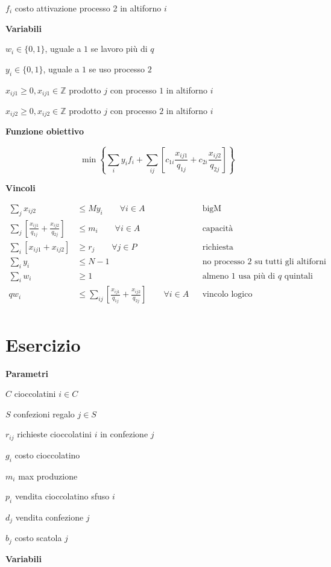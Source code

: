 \documentclass[10pt,a4paper,twoside,openright]{book}
\newcounter{es}
\newcommand{\Es}{
	\stepcounter{es}
	\section{Esercizio \arabic{es}}
	}
\numberwithin{es}{chapter}
\newcommand{\Par}{\textbf{Parametri}}
\newcommand{\Var}{\textbf{Variabili}}
\newcommand{\Fob}{\textbf{Funzione obiettivo}}
\newcommand{\Vin}{\textbf{Vincoli}}
\begin{document}
$f_{i}$ costo attivazione processo 2 in altiforno $i$

\Var

$w_{i} \in \{0,1\}$, uguale a $1$ se lavoro più di $q$

$y_{i} \in \{0,1\}$, uguale a $1$ se uso processo $2$

$x_{ij1} \geq 0,x_{ij1} \in \mathbb{Z}$ prodotto $j$ con processo $1$ in altiforno $i$

$x_{ij2} \geq 0,x_{ij2} \in \mathbb{Z}$ prodotto $j$ con processo $2$ in altiforno $i$

\Fob

\begin{equation*}
	\min \left\{\sum _{i} y_{i} f_{i} +\sum _{ij}\left[ c_{1i}\frac{x_{ij1}}{q_{1j}} +c_{2i}\frac{x_{ij2}}{q_{2j}}\right]\right\}
\end{equation*}

\Vin

\begin{align*}
	\sum _{j} x_{ij2} & \leq My_{i} \qquad\forall i\in A && \text{bigM} \\
	\sum _{j}\left[\frac{x_{ij1}}{q_{1j}} +\frac{x_{ij2}}{q_{2j}}\right] & \leq m_{i} \qquad\forall i\in A && \text{capacità} \\
	\sum _{i}[ x_{ij1} +x_{ij2}] & \geq r_{j} \qquad\forall j\in P && \text{richiesta} \\
	\sum _{i} y_{i} & \leq N-1 && \text{no processo $2$ su tutti gli altiforni} \\
	\sum _{i} w_{i} & \geq 1 && \text{almeno 1 usa più di $q$ quintali} \\
	qw_{i} & \leq \sum _{ij}\left[\frac{x_{ij1}}{q_{1j}} +\frac{x_{ij2}}{q_{2j}}\right] \qquad\forall i\in A && \text{vincolo logico} \\
\end{align*}

\Es

\Par

$C$ cioccolatini $i\in C$

$S$ confezioni regalo $j\in S$

$r_{ij}$ richieste cioccolatini $i$ in confezione $j$

$g_{i}$ costo cioccolatino

$m_{i}$ max produzione

$p_{i}$ vendita cioccolatino sfuso $i$

$d_{j}$ vendita confezione $j$

$b_{j}$ costo scatola $j$

\Var
\end{document}
